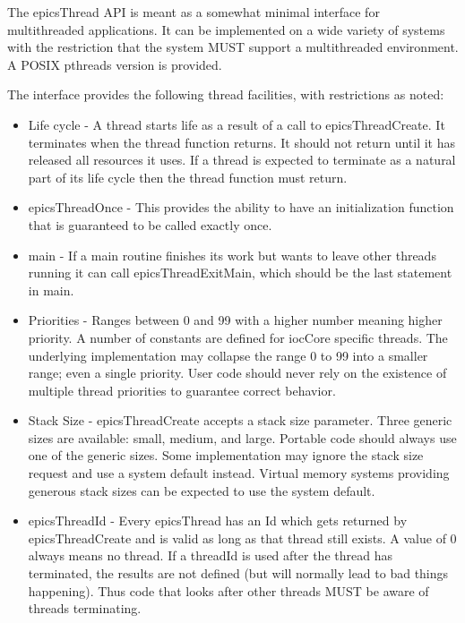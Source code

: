 The epicsThread API is meant as a somewhat minimal interface for multithreaded applications.
It can be implemented on a wide variety of systems with the restriction that the system MUST support a multithreaded environment.
A POSIX pthreads version is provided.

The interface provides the following thread facilities, with restrictions as noted:

\begin{itemize}
\item Life cycle - A thread starts life as a result of a call to epicsThreadCreate.
It terminates when the thread function returns.
It should not return until it has released all resources it uses.
If a thread is expected to terminate as a natural part of its life cycle then the thread function must return.

\item epicsThreadOnce - This provides the ability to have an initialization function that is guaranteed to be called exactly once.

\item main - If a main routine finishes its work but wants to leave other threads running it can call epicsThreadExitMain, which should be the last statement in main.

\item Priorities - Ranges between 0 and 99 with a higher number meaning higher priority.
A number of constants are defined for iocCore specific threads.
The underlying implementation may collapse the range 0 to 99 into a smaller range; even a single priority.
User code should never rely on the existence of multiple thread priorities to guarantee correct behavior.

\item Stack Size - epicsThreadCreate accepts a stack size parameter.
Three generic sizes are available: small, medium, and large.
Portable code should always use one of the generic sizes.
Some implementation may ignore the stack size request and use a system default instead.
Virtual memory systems providing generous stack sizes can be expected to use the system default.

\item epicsThreadId - Every epicsThread has an Id which gets returned by epicsThreadCreate and is valid as long as that thread still exists.
A value of 0 always means no thread.
If a threadId is used after the thread has terminated, the results are not defined (but will normally lead to bad things happening).
Thus code that looks after other threads MUST be aware of threads terminating.

\end{itemize}

